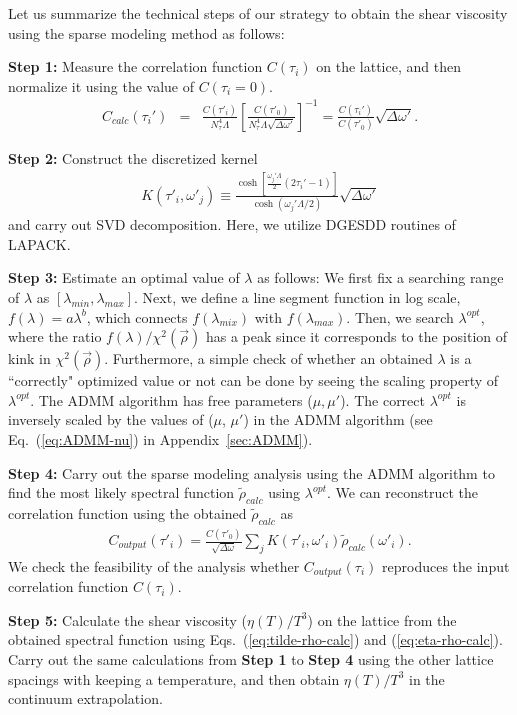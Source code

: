 \documentclass[a4paper,11pt]{article}
\newcommand\beq{ \begin{eqnarray} }
\newcommand\eeq{ \end{eqnarray} }
\begin{document}
Let us summarize the technical steps of our strategy to obtain the shear viscosity using the sparse modeling method as follows:

{\bf Step 1:} Measure the correlation function $C(\tau_i)$ on the lattice, and then normalize it using the value of $C(\tau_i=0)$.
\beq
C_{calc} (\tau_i') &=& \frac{C(\tau'_i)}{N_\tau^4 \Lambda} \left[  \frac{C(\tau'_0)}{N_\tau^4 \Lambda  \sqrt{\Delta \omega'}}   \right]^{-1}= \frac{C(\tau_i')}{C(\tau'_0)} \sqrt{\Delta \omega '}.\label{eq:norm-C}
\eeq


{\bf Step 2:} Construct the discretized kernel
\beq
K(\tau'_i,\omega'_j)  \equiv \frac{\cosh [\frac{\omega_j ' \Lambda }{2} (2 \tau_i' -1)]}{\cosh (\omega_j ' \Lambda /2)} \sqrt{\Delta \omega'}\label{eq:kernel-SVD}
\eeq
and carry out SVD decomposition. Here, we utilize DGESDD routines of LAPACK.  


{\bf Step 3:} Estimate an optimal value of $\lambda$ as follows:
We first fix a searching range of $\lambda$ as $[\lambda_{min},\lambda_{max}]$.
Next, we define a line segment function in log scale, $f(\lambda)=a \lambda^b$, which connects $f(\lambda_{mix})$ with $f(\lambda_{max})$.
Then, we search $\lambda^{opt}$, where the ratio $f(\lambda)/\chi^2(\vec{\rho})$ has a peak since it corresponds to the position of kink in $\chi^2 (\vec{\rho})$. 
Furthermore, a simple check of whether an obtained $\lambda$ is a ``correctly" optimized value or not can be done by seeing the scaling property of $\lambda^{opt}$.
The ADMM algorithm has free parameters ($\mu, \mu'$).
The correct $\lambda^{opt}$ is inversely scaled by the values of ($\mu$, $\mu'$) in the ADMM algorithm (see Eq.~(\ref{eq:ADMM-nu}) in Appendix~\ref{sec:ADMM}).


{\bf Step 4:} Carry out the sparse modeling analysis using the ADMM algorithm to find the most likely spectral function $\tilde{\rho}_{calc}$ using $\lambda^{opt}$.
We can  reconstruct the correlation function using the obtained $\tilde{\rho}_{calc}$ as 
\beq
C_{output}(\tau'_i) = \frac{C(\tau'_0)}{\sqrt{\Delta \omega}} \sum_j K(\tau'_i, \omega'_i) \tilde{\rho}_{calc} (\omega'_i) .
\eeq
We check the feasibility of the analysis whether  $C_{output} (\tau_i)$ reproduces the input correlation function $C(\tau_i)$.


{\bf Step 5:} Calculate the shear viscosity ($\eta(T)/T^3$) on the lattice from the obtained spectral function using Eqs.~(\ref{eq:tilde-rho-calc}) and (\ref{eq:eta-rho-calc}).
Carry out the same calculations from {\bf Step 1} to {\bf Step 4} using the other lattice spacings with keeping a temperature, and then obtain $\eta(T)/T^3$ in the continuum extrapolation.
\end{document}
